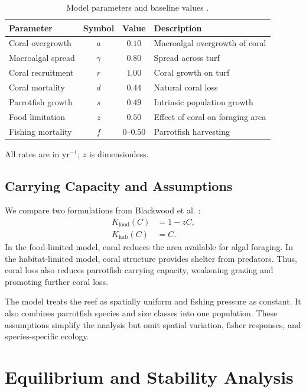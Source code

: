 \documentclass[10pt,a4paper]{article}
\begin{document}
\begin{table}[htbp]
\centering
\small
\caption{Model parameters and baseline values \cite{mumby2007,blackwood2012}.}
\label{tab:parameters}
\begin{tabularx}{\textwidth}{@{}l c c X@{}}
\toprule
Parameter & Symbol & Value & Description\\
\midrule
Coral overgrowth & $a$ & $0.10$ & Macroalgal overgrowth of coral\\
Macroalgal spread & $\gamma$ & $0.80$ & Spread across turf\\
Coral recruitment & $r$ & $1.00$ & Coral growth on turf\\
Coral mortality & $d$ & $0.44$ & Natural coral loss\\
Parrotfish growth & $s$ & $0.49$ & Intrinsic population growth\\
Food limitation & $z$ & $0.50$ & Effect of coral on foraging area\\
Fishing mortality & $f$ & $0$--$0.50$ & Parrotfish harvesting\\
\bottomrule
\end{tabularx}
\end{table}
All rates are in $\mathrm{yr}^{-1}$; $z$ is dimensionless.

\subsection{Carrying Capacity and Assumptions}

We compare two formulations from Blackwood et al. \cite{blackwood2012}:
\begin{align}
    K_{\mathrm{food}}(C)&=1-zC, \label{eq:Kfood}\\
    K_{\mathrm{hab}}(C)&=C. \label{eq:Khab}
\end{align}
In the food-limited model, coral reduces the area available for algal foraging. In the habitat-limited model, coral structure provides shelter from predators. Thus, coral loss also reduces parrotfish carrying capacity, weakening grazing and promoting further coral loss.

The model treats the reef as spatially uniform and fishing pressure as constant. It also combines parrotfish species and size classes into one population. These assumptions simplify the analysis but omit spatial variation, fisher responses, and species-specific ecology.

\section{Equilibrium and Stability Analysis}
\end{document}
